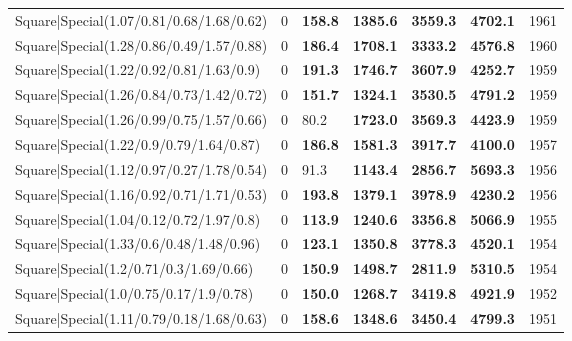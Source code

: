 \begin{tabular}{lrllllr}
 Square|Special(1.07/0.81/0.68/1.68/0.62)                      &             0   & \textbf{158.8} & \textbf{1385.6} & \textbf{3559.3} & \textbf{4702.1} &         1961 \\
 Square|Special(1.28/0.86/0.49/1.57/0.88)                      &             0   & \textbf{186.4} & \textbf{1708.1} & \textbf{3333.2} & \textbf{4576.8} &         1960 \\
 Square|Special(1.22/0.92/0.81/1.63/0.9)                       &             0   & \textbf{191.3} & \textbf{1746.7} & \textbf{3607.9} & \textbf{4252.7} &         1959 \\
 Square|Special(1.26/0.84/0.73/1.42/0.72)                      &             0   & \textbf{151.7} & \textbf{1324.1} & \textbf{3530.5} & \textbf{4791.2} &         1959 \\
 Square|Special(1.26/0.99/0.75/1.57/0.66)                      &             0   & 80.2           & \textbf{1723.0} & \textbf{3569.3} & \textbf{4423.9} &         1959 \\
 Square|Special(1.22/0.9/0.79/1.64/0.87)                       &             0   & \textbf{186.8} & \textbf{1581.3} & \textbf{3917.7} & \textbf{4100.0} &         1957 \\
 Square|Special(1.12/0.97/0.27/1.78/0.54)                      &             0   & 91.3           & \textbf{1143.4} & \textbf{2856.7} & \textbf{5693.3} &         1956 \\
 Square|Special(1.16/0.92/0.71/1.71/0.53)                      &             0   & \textbf{193.8} & \textbf{1379.1} & \textbf{3978.9} & \textbf{4230.2} &         1956 \\
 Square|Special(1.04/0.12/0.72/1.97/0.8)                       &             0   & \textbf{113.9} & \textbf{1240.6} & \textbf{3356.8} & \textbf{5066.9} &         1955 \\
 Square|Special(1.33/0.6/0.48/1.48/0.96)                       &             0   & \textbf{123.1} & \textbf{1350.8} & \textbf{3778.3} & \textbf{4520.1} &         1954 \\
 Square|Special(1.2/0.71/0.3/1.69/0.66)                        &             0   & \textbf{150.9} & \textbf{1498.7} & \textbf{2811.9} & \textbf{5310.5} &         1954 \\
 Square|Special(1.0/0.75/0.17/1.9/0.78)                        &             0   & \textbf{150.0} & \textbf{1268.7} & \textbf{3419.8} & \textbf{4921.9} &         1952 \\
 Square|Special(1.11/0.79/0.18/1.68/0.63)                      &             0   & \textbf{158.6} & \textbf{1348.6} & \textbf{3450.4} & \textbf{4799.3} &         1951 \\

\end{tabular}
